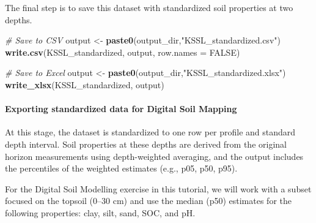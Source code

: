 \documentclass[
  10pt,
  b5paper,
  oneside]{book}
\newenvironment{Shaded}{\begin{snugshade}}{\end{snugshade}}
\newcommand{\AttributeTok}[1]{\textcolor[rgb]{0.13,0.29,0.53}{#1}}
\newcommand{\CommentTok}[1]{\textcolor[rgb]{0.56,0.35,0.01}{\textit{#1}}}
\newcommand{\ConstantTok}[1]{\textcolor[rgb]{0.56,0.35,0.01}{#1}}
\newcommand{\FunctionTok}[1]{\textcolor[rgb]{0.13,0.29,0.53}{\textbf{#1}}}
\newcommand{\NormalTok}[1]{#1}
\newcommand{\OtherTok}[1]{\textcolor[rgb]{0.56,0.35,0.01}{#1}}
\newcommand{\StringTok}[1]{\textcolor[rgb]{0.31,0.60,0.02}{#1}}
\begin{document}
The final step is to save this dataset with standardized soil properties at two depths.

\begin{Shaded}
\begin{Highlighting}[]
\CommentTok{\# Save to CSV}
\NormalTok{output }\OtherTok{\textless{}{-}} \FunctionTok{paste0}\NormalTok{(output\_dir,}\StringTok{"KSSL\_standardized.csv"}\NormalTok{)}
\FunctionTok{write.csv}\NormalTok{(KSSL\_standardized, output, }\AttributeTok{row.names =} \ConstantTok{FALSE}\NormalTok{)}

\CommentTok{\# Save to Excel}
\NormalTok{output }\OtherTok{\textless{}{-}} \FunctionTok{paste0}\NormalTok{(output\_dir,}\StringTok{"KSSL\_standardized.xlsx"}\NormalTok{)}
\FunctionTok{write\_xlsx}\NormalTok{(KSSL\_standardized, output)}
\end{Highlighting}
\end{Shaded}

\paragraph*{Exporting standardized data for Digital Soil Mapping}\label{exporting-standardized-data-for-digital-soil-mapping}

At this stage, the dataset is standardized to one row per profile and standard depth interval. Soil properties at these depths are derived from the original horizon measurements using depth-weighted averaging, and the output includes the percentiles of the weighted estimates (e.g., p05, p50, p95).

For the Digital Soil Modelling exercise in this tutorial, we will work with a subset focused on the topsoil (0--30 cm) and use the median (p50) estimates for the following properties: clay, silt, sand, SOC, and pH.
\end{document}
